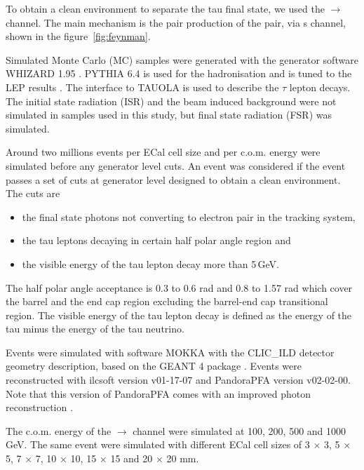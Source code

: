 \documentclass[a4paper,11pt]{article}
\begin{document}
To obtain a clean environment to separate the tau final state, we used the  \Pelectron\APelectron $\to$ \Ptauon\APtauon channel. The main mechanism is the pair production of the \Ptau pair, via s channel, shown in the figure~\ref{fig:feynman}. 

Simulated Monte Carlo (MC) samples were generated with the generator software WHIZARD 1.95 \cite{whizard}. PYTHIA 6.4 \cite{Sjostrand:1995iq} is used for the hadronisation and is tuned to the LEP results \cite{}. The interface to TAUOLA \cite{Jadach:1993hs} is used to describe the $\tau$ lepton decays. The initial state radiation (ISR) and the beam induced background were not simulated in samples used in this study, but final state radiation (FSR) was simulated.

Around two millions events per ECal cell size and per c.o.m. energy were simulated before any generator level cuts. An event was considered if the event passes a set of cuts at generator level designed to obtain a clean environment. The cuts are 
\begin{itemize}
 \item the final state photons not converting to electron pair in the tracking system,
  \item the tau leptons decaying in certain half polar angle region and
  \item the visible energy of the tau lepton decay more than 5\,GeV.
\end{itemize}

The half polar angle acceptance is 0.3 to 0.6 rad and 0.8 to 1.57 rad which cover the barrel and the end cap region excluding the barrel-end cap transitional region. The visible energy of the tau lepton decay is defined as the energy of the tau minus the energy of the tau neutrino.

Events were simulated with software MOKKA \cite{MoradeFreitas:2002kj} with the CLIC\_ILD detector geometry description, based on the GEANT 4 package  \cite{Agostinelli:2002hh}. Events were reconstructed with ilcsoft version v01-17-07 \cite{Gaede:82475} and PandoraPFA version v02-02-00. Note that this version of PandoraPFA comes with an improved photon reconstruction \cite{Xu:2016rcz}.

The c.o.m. energy of the \Pelectron\APelectron $\to$ \Ptauon\APtauon channel were simulated at 100, 200, 500 and 1000 GeV. The same event were simulated with different ECal cell sizes of 3 $\times$ 3, 5 $\times$ 5, 7 $\times$ 7, 10 $\times$ 10, 15 $\times$ 15 and 20 $\times$ 20 mm.
\end{document}
